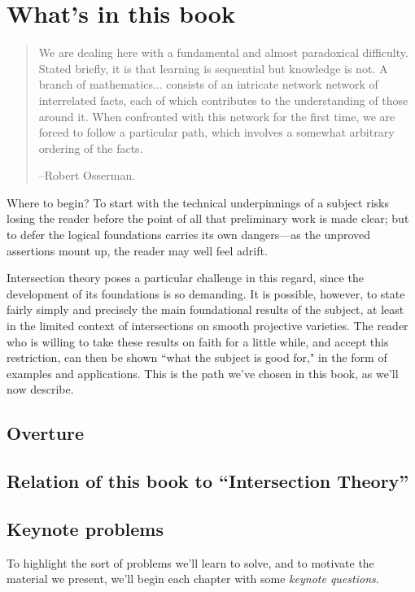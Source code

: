 \section{What's in this book}


\begin{quote}
\small\sf
We are dealing here with a fundamental and almost paradoxical difficulty. Stated briefly, it is that learning is sequential but knowledge is not. A branch of mathematics... consists of an intricate network network of interrelated facts, each of which contributes to the understanding of those around it. When confronted with this network for the first time, we are forced to follow a particular path, which involves a somewhat arbitrary ordering of the facts.

--Robert Osserman.

\end{quote}



Where to begin? To start with the technical underpinnings of a subject risks losing the reader before the point of all that preliminary work is made clear; but to defer the logical foundations carries its own dangers---as the unproved assertions mount up, the reader may well feel adrift.

Intersection theory poses a particular challenge in this regard, since the development of its foundations is so demanding. It is possible, however, to state fairly simply and precisely the main foundational results of the subject, at least in the limited context of intersections on smooth projective varieties. The reader who is willing to take these results on faith for a little while, and accept this restriction, can then be shown ``what the subject is good for," in the form of examples and applications. This is the path we've chosen in this book, as we'll now describe.

\subsection{Overture}


\subsection{Relation of this book to ``Intersection Theory''} 


\subsection{Keynote problems} To highlight the sort of problems we'll  learn to solve, and to motivate the material we present, we'll begin each chapter with some {\it keynote questions}. 


